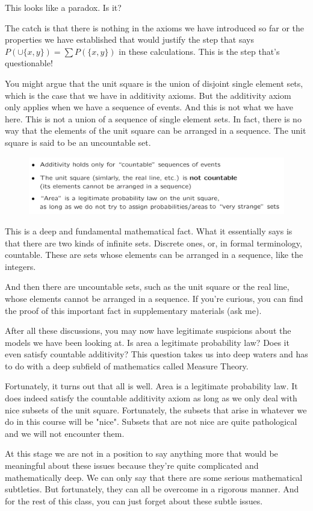 \documentclass{tufte-handout}
\begin{document}
\vspace{0.3cm}
This
looks like a paradox. Is it? 

\vspace{0.3cm}
The catch is that there is nothing in the axioms we have introduced so far or
the properties we have established that would justify the step that says
$P ( \cup \{ x, y\} ) = \sum P(\{ x, y\} ) $ in these calculations. This is the step that's questionable!


You might argue that the unit square is the union of disjoint single element sets, which is the case that
we have in additivity axioms. But the additivity axiom only applies when we have a sequence of events.
And this is not what we have here. This is not a union of a sequence of single element sets. In fact,
there is no way that the elements of the unit square can be arranged in a sequence. The unit square is
said to be an uncountable set.

\begin{figure}
  \includegraphics{NoCountable}
\end{figure}


This is a deep and fundamental mathematical fact. What it essentially says is that there are two kinds of
infinite sets. Discrete ones, or, in formal terminology, countable. These are sets whose elements can be
arranged in a sequence, like the integers. 

And then there are uncountable sets, such as the unit square or the
real line, whose elements cannot be arranged in a sequence. If you're curious, you can find the proof of
this important fact in supplementary materials (ask me).

\vspace{0.3cm}
After all these discussions, you may now have legitimate suspicions about the models we have been
looking at. Is area a legitimate probability law? Does it even satisfy countable additivity? This question
takes us into deep waters and has to do with a deep subfield of mathematics called Measure Theory.

Fortunately, it turns out that all is well. Area is a legitimate probability law. It does indeed satisfy the
countable additivity axiom as long as we only deal with nice subsets of the unit square. Fortunately, the
subsets that arise in whatever we do in this course will be "nice". Subsets that are not nice are quite
pathological and we will not encounter them.

At this stage we are not in a position to say anything more that would be meaningful about these issues
because they're quite complicated and mathematically deep. We can only say that there are some
serious mathematical subtleties. But fortunately, they can all be overcome in a rigorous manner. And for
the rest of this class, you can just forget about these subtle issues.
\end{document}
